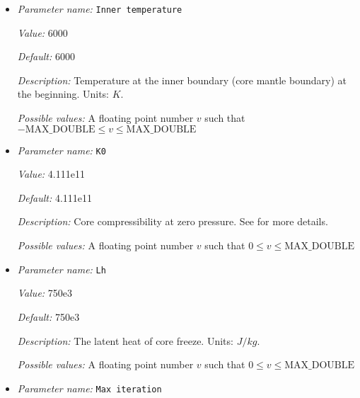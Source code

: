 \begin{itemize}
{\it Value:} 0.01


{\it Default:} 0.01


{\it Description:} Initial light composition (eg. S,O) concentration in weight fraction.


{\it Possible values:} A floating point number $v$ such that $0 \leq v \leq \text{MAX\_DOUBLE}$
\item {\it Parameter name:} {\tt Inner temperature}
\label{parameters:Boundary temperature model/Dynamic core/Inner temperature}


{\it Value:} 6000


{\it Default:} 6000


{\it Description:} Temperature at the inner boundary (core mantle boundary) at the beginning. Units: $K$.


{\it Possible values:} A floating point number $v$ such that $-\text{MAX\_DOUBLE} \leq v \leq \text{MAX\_DOUBLE}$
\item {\it Parameter name:} {\tt K0}
\label{parameters:Boundary temperature model/Dynamic core/K0}


{\it Value:} 4.111e11


{\it Default:} 4.111e11


{\it Description:} Core compressibility at zero pressure. See \cite{NPB+04} for more details.


{\it Possible values:} A floating point number $v$ such that $0 \leq v \leq \text{MAX\_DOUBLE}$
\item {\it Parameter name:} {\tt Lh}
\label{parameters:Boundary temperature model/Dynamic core/Lh}


{\it Value:} 750e3


{\it Default:} 750e3


{\it Description:} The latent heat of core freeze. Units: $J/kg$.


{\it Possible values:} A floating point number $v$ such that $0 \leq v \leq \text{MAX\_DOUBLE}$
\item {\it Parameter name:} {\tt Max iteration}
\label{parameters:Boundary temperature model/Dynamic core/Max iteration}



\end{itemize}
